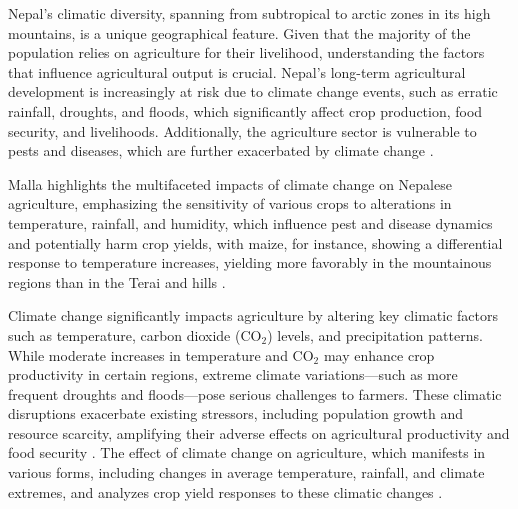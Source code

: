 Nepal’s climatic diversity, spanning from subtropical to arctic zones in its high mountains, is a unique geographical feature. Given that the majority of the population relies on agriculture for their livelihood, understanding the factors that influence agricultural output is crucial. Nepal's long-term agricultural development is increasingly at risk due to climate change events, such as erratic rainfall, droughts, and floods, which significantly affect crop production, food security, and livelihoods. Additionally, the agriculture sector is vulnerable to pests and diseases, which are further exacerbated by climate change \citep{gyawaliOverviewAgricultureNepal2021}.

Malla highlights the multifaceted impacts of climate change on Nepalese agriculture, emphasizing the sensitivity of various crops to alterations in temperature, rainfall, and humidity, which influence pest and disease dynamics and potentially harm crop yields, with maize, for instance, showing a differential response to temperature increases, yielding more favorably in the mountainous regions than in the Terai and hills \citep{mallaClimateChangeIts2009}.

 
Climate change significantly impacts agriculture by altering key climatic factors such as temperature, carbon dioxide (CO$_2$) levels, and precipitation patterns. While moderate increases in temperature and CO$_2$ may enhance crop productivity in certain regions, extreme climate variations—such as more frequent droughts and floods—pose serious challenges to farmers. These climatic disruptions exacerbate existing stressors, including population growth and resource scarcity, amplifying their adverse effects on agricultural productivity and food security \citep{global_paudel_2015}. The effect of climate change on agriculture, which manifests in various forms, including changes in average temperature, rainfall, and climate extremes, and analyzes crop yield responses to these climatic changes \citep{regmiCropYieldResponse2019}.

